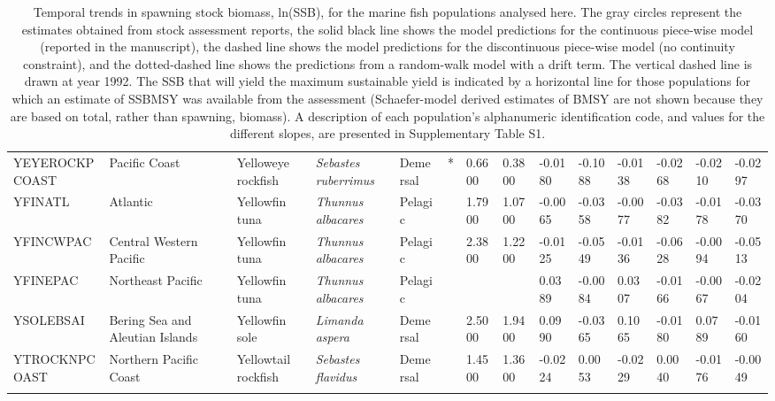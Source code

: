 \begin{longtable}{p{2.8cm}p{2cm}p{1.7cm}p{1.7cm}p{1cm}p{0.3cm}p{1cm}p{1cm}p{1cm}p{1cm}p{1cm}p{1cm}p{1cm}p{1cm}}
  YEYEROCKPCOAST & Pacific Coast & Yelloweye rockfish & \textit{Sebastes ruberrimus} & Demersal & * & 0.6600 & 0.3800 & -0.0180 & -0.1088 & -0.0138 & -0.0268 & -0.0210 & -0.0297 \\ 
  YFINATL & Atlantic & Yellowfin tuna & \textit{Thunnus albacares} & Pelagic &   & 1.7900 & 1.0700 & -0.0065 & -0.0358 & -0.0077 & -0.0382 & -0.0178 & -0.0370 \\ 
  YFINCWPAC & Central Western Pacific & Yellowfin tuna & \textit{Thunnus albacares} & Pelagic &   & 2.3800 & 1.2200 & -0.0125 & -0.0549 & -0.0136 & -0.0628 & -0.0094 & -0.0513 \\ 
  YFINEPAC & Northeast Pacific & Yellowfin tuna & \textit{Thunnus albacares} & Pelagic &  &  &  & 0.0389 & -0.0084 & 0.0307 & -0.0166 & -0.0067 & -0.0204 \\ 
  YSOLEBSAI & Bering Sea and Aleutian Islands & Yellowfin sole & \textit{Limanda aspera} & Demersal &   & 2.5000 & 1.9400 & 0.0990 & -0.0365 & 0.1065 & -0.0180 & 0.0789 & -0.0160 \\ 
  YTROCKNPCOAST & Northern Pacific Coast & Yellowtail rockfish & \textit{Sebastes flavidus} & Demersal &   & 1.4500 & 1.3600 & -0.0224 & 0.0053 & -0.0229 & 0.0040 & -0.0176 & -0.0049 \\ 
   \hline
\hline
\caption{Temporal trends in spawning stock biomass, ln(SSB), for the marine fish populations analysed here. The gray circles represent the estimates obtained from stock assessment reports, the solid black line shows the model predictions for the continuous piece-wise model (reported in the manuscript), the dashed line shows the model predictions for the discontinuous piece-wise model (no continuity constraint), and the dotted-dashed line shows the predictions from a random-walk model with a drift term. The vertical dashed line is drawn at year 1992. The SSB that will yield the maximum sustainable yield is indicated by a horizontal line for those populations for which an estimate of SSBMSY was available from the assessment (Schaefer-model derived estimates of BMSY are not shown because they are based on total, rather than spawning, biomass). A description of each population's alphanumeric identification code, and values for the different slopes, are presented in Supplementary Table S1.}
\label{tab:S1}
\end{longtable}
